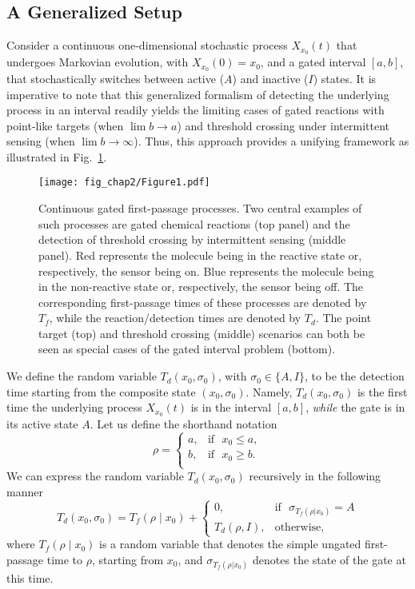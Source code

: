\subsection{A Generalized Setup} \label{genset}

Consider a continuous one-dimensional stochastic process $X_{x_0}(t)$ that undergoes Markovian evolution, with $X_{x_0}(0)=x_0$, and a gated interval $[a,b]$, that stochastically switches between active ($A$) and inactive ($I$) states. It is imperative to note that this generalized formalism of detecting the underlying process in an interval readily yields the limiting cases of gated reactions with point-like targets (when $\lim b \to a$) and threshold crossing under intermittent sensing (when $\lim b \to \infty$). Thus, this approach provides a unifying framework as illustrated in Fig.~\ref{cont_fig1}. 


\begin{figure}[h]
\centering
\texttt{[image: fig\_chap2/Figure1.pdf]}
\caption{Continuous gated first-passage processes. Two central examples of such processes are gated chemical reactions (top panel) and the detection of threshold crossing by intermittent sensing (middle panel). Red represents the molecule being in the reactive state or, respectively, the sensor being on. Blue represents the molecule being in the non-reactive state or, respectively, the sensor being off. The corresponding first-passage times of these processes are denoted by $T_f$, while the reaction/detection times are denoted by $T_d$. The point target (top) and threshold crossing (middle) scenarios can both be seen as special cases of the gated interval problem (bottom).}
\label{cont_fig1}
\end{figure} 


We define the random variable $T_d(x_0,\sigma_0)$, with $\sigma_{0} \in \{A, I\}$, to be the detection time starting from the composite state $(x_0,\sigma_0)$. Namely, $T_d(x_0,\sigma_0)$ is the first time the underlying process $X_{x_0}(t)$ is in the interval $[a,b]$, \emph{while} the gate is in its active state $A$. Let us define the shorthand notation 
%
\begin{equation}  \label{rho}
\rho = 
    \begin{cases}
    a, &\text{if~~} x_0 \le a,\\
    b, &\text{if~~} x_0 \ge b. \\
    \end{cases}
\end{equation}
%
We can express the random variable $T_d(x_0,\sigma_0)$ recursively in the following manner
%
\begin{equation}  \label{renewal_interval1}
T_d(x_0,\sigma_0)= T_f(\rho \mid x_0) +
    \begin{cases}
      0, &\text{if~~} \sigma_{T_f(\rho|x_0)}=A\\
       T_d(\rho,I), &\text{otherwise},
    \end{cases}
\end{equation}
%
where $T_f(\rho \mid x_0)$ is a random variable that denotes the simple ungated first-passage time to $\rho$, starting from $x_0$, and $\sigma_{T_f(\rho|x_0)}$ denotes the state of the gate at this time. 

